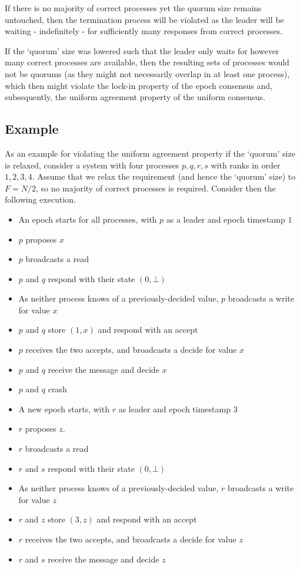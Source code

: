 \documentclass[a4paper]{scrreprt}
\begin{document}
If there is no majority of correct processes yet the quorum size remains
untouched, then the termination process will be violated as the leader will be
waiting - indefinitely - for sufficiently many responses from correct
processes.

If the `quorum' size was lowered such that the leader only waits for however
many correct processes are available, then the resulting sets of processes
would not be quorums (as they might not necessarily overlap in at least one
process), which then might violate the lock-in property of the epoch consensus
and, subsequently, the uniform agreement property of the uniform consensus.

\subsection{Example}

As an example for violating the uniform agreement property if the `quorum' size
is relaxed, consider a system with four processes $p, q, r, s$ with ranks in
order $1, 2, 3, 4$. Assume that we relax the requirement (and hence the
`quorum' size) to $F = N/2$, so no majority of correct processes is required.
Consider then the following execution.

\begin{itemize}
	\item An epoch starts for all processes, with $p$ as a leader and epoch
		timestamp $1$
	\item $p$ proposes $x$
	\item $p$ broadcasts a read
	\item $p$ and $q$ respond with their state $(0, \bot)$
	\item As neither process knows of a previously-decided value, $p$
		broadcasts a write for value $x$
	\item $p$ and $q$ store $(1, x)$ and respond with an accept
	\item $p$ receives the two accepts, and broadcasts a decide for value
		$x$
	\item $p$ and $q$ receive the message and decide $x$
	\item $p$ and $q$ crash
	\item A new epoch starts, with $r$ as leader and epoch timestamp $3$
	\item $r$ proposes $z$.
	\item $r$ broadcasts a read
	\item $r$ and $s$ respond with their state $(0, \bot)$
	\item As neither process knows of a previously-decided value, $r$
		broadcasts a write for value $z$
	\item $r$ and $z$ store $(3, z)$ and respond with an accept
	\item $r$ receives the two accepts, and broadcasts a decide for value
		$z$
	\item $r$ and $s$ receive the message and decide $z$
\end{itemize}
\end{document}
